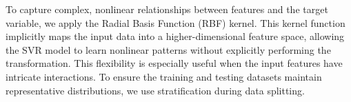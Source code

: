 To capture complex, nonlinear relationships between features and the target variable, we apply the Radial Basis Function (RBF) kernel. This kernel function implicitly maps the input data into a higher-dimensional feature space, allowing the SVR model to learn nonlinear patterns without explicitly performing the transformation. This flexibility is especially useful when the input features have intricate interactions. To ensure the training and testing datasets maintain representative distributions, we use stratification during data splitting.
    